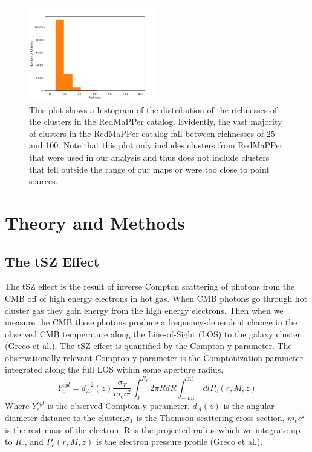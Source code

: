 \documentclass{princeton_astro_thesis}
\begin{document}
\begin{figure}[h]
\centering
\includegraphics[width=0.5\textwidth]{../redmapper_richness_hist.png}
\caption{This plot shows a histogram of the distribution of the richnesses of the clusters in the RedMaPPer catalog. Evidently, the vast majority of clusters in the RedMaPPer catalog fall between richnesses of 25 and 100. Note that this plot only includes clusters from RedMaPPer that were used in our analysis and thus does not include clusters that fell outside the range of our maps or were too close to point sources. }
\end{figure}

 \chapter{Theory and Methods}
\section{The tSZ Effect}
The tSZ effect is the result of inverse Compton scattering of photons from the CMB off of high energy electrons in hot gas. When CMB photons go through hot cluster gas they gain energy from the high energy electrons. Then when we measure the CMB these photons produce a frequency-dependent change in the observed CMB temperature along the Line-of-Sight (LOS) to the galaxy cluster (Greco et al.). The tSZ effect is quantified by the Compton-y parameter. The observationally relevant Compton-y parameter is the Comptonization parameter integrated along the full LOS within some aperture radius,
\begin{equation}
Y^{cyl}_{c}=d^{-2}_A(z) \frac{\sigma_T}{m_e c^2}\int_0^{R_c} 2 \pi R dR \int_{-\inf}^{\inf} dl P_e(r,M,z)
\end{equation}
Where $Y^{cyl}_{c}$ is the observed Compton-y parameter, $d_A(z)$ is the angular diameter distance to the cluster,$\sigma_T$ is the Thomson scattering cross-section, $m_e c^2$ is the rest mass of the electron, R is the  projected radius which we integrate up to $R_c$,  and $P_e(r,M,z)$ is the electron pressure profile (Greco et al.).
\end{document}
